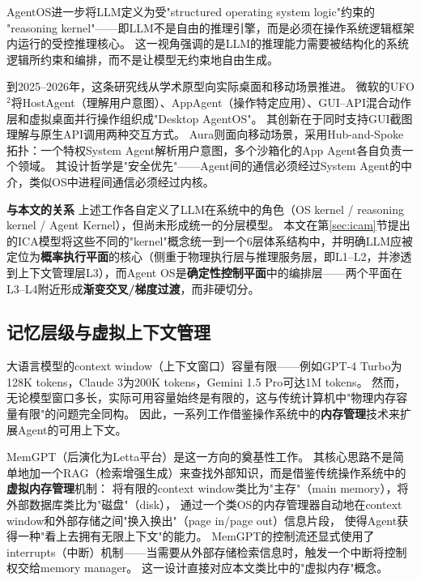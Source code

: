 AgentOS\cite{agentos2025}进一步将LLM定义为受"structured operating system logic"约束的%
"reasoning kernel"——即LLM不是自由的推理引擎，而是必须在操作系统逻辑框架内运行的受控推理核心。
这一视角强调的是LLM的推理能力需要被结构化的系统逻辑所约束和编排，而不是让模型无约束地自由生成。

到2025--2026年，这条研究线从学术原型向实际桌面和移动场景推进。
微软的UFO$^2$\cite{ufo2_2025}将HostAgent（理解用户意图）、AppAgent（操作特定应用）、GUI--API混合动作层和虚拟桌面并行操作组织成"Desktop AgentOS"。
其创新在于同时支持GUI截图理解与原生API调用两种交互方式。
Aura\cite{aura2025}则面向移动场景，采用Hub-and-Spoke拓扑：一个特权System Agent解析用户意图，多个沙箱化的App Agent各自负责一个领域。
其设计哲学是"安全优先"——Agent间的通信必须经过System Agent的中介，类似OS中进程间通信必须经过内核。

\textbf{与本文的关系}
上述工作各自定义了LLM在系统中的角色（OS kernel / reasoning kernel / Agent Kernel），但尚未形成统一的分层模型。
本文在第\ref{sec:icam}节提出的ICA模型将这些不同的"kernel"概念统一到一个6层体系结构中，并明确LLM应被定位为\textbf{概率执行平面}的核心（侧重于物理执行层与推理服务层，即L1--L2，并渗透到上下文管理层L3），而Agent OS是\textbf{确定性控制平面}中的编排层——两个平面在L3--L4附近形成\textbf{渐变交叉/梯度过渡}，而非硬切分。

\subsection{记忆层级与虚拟上下文管理}
\label{sec:related-memory}

大语言模型的context window（上下文窗口）容量有限——例如GPT-4 Turbo为128K tokens，Claude 3为200K tokens，Gemini 1.5 Pro可达1M tokens\cite{gemini2024}。
然而，无论模型窗口多长，实际可用容量始终是有限的，这与传统计算机中"物理内存容量有限"的问题完全同构。
因此，一系列工作借鉴操作系统中的\textbf{内存管理}技术来扩展Agent的可用上下文。

MemGPT\cite{memgpt2023}（后演化为Letta平台）是这一方向的奠基性工作。
其核心思路不是简单地加一个RAG（检索增强生成）\cite{lewis2020rag}来查找外部知识，而是借鉴传统操作系统中的\textbf{虚拟内存管理}机制：
将有限的context window类比为"主存"（main memory），将外部数据库类比为"磁盘"（disk），
通过一个类OS的内存管理器自动地在context window和外部存储之间"换入换出"（page in/page out）信息片段，
使得Agent获得一种"看上去拥有无限上下文"的能力。
MemGPT的控制流还显式使用了interrupts（中断）机制——当需要从外部存储检索信息时，触发一个中断将控制权交给memory manager。
这一设计直接对应本文类比中的"虚拟内存"概念。

